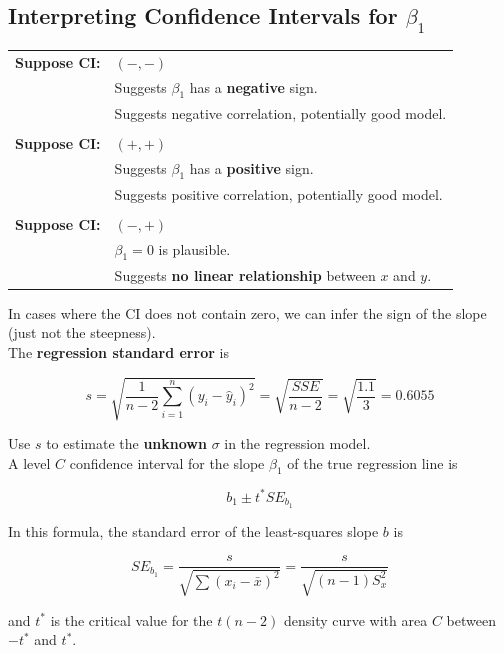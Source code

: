 \subsection*{Interpreting Confidence Intervals for $\beta_1$}

\begin{center}
\begin{tabular}{rl}
\textbf{Suppose CI:} & $(-, -)$ \\
& Suggests $\beta_1$ has a \textbf{negative} sign. \\
& Suggests negative correlation, potentially good model. \\
\\
\textbf{Suppose CI:} & $(+, +)$ \\
& Suggests $\beta_1$ has a \textbf{positive} sign. \\
& Suggests positive correlation, potentially good model. \\
\\
\textbf{Suppose CI:} & $(-, +)$ \\
& $\beta_1 = 0$ is plausible. \\
& Suggests \textbf{no linear relationship} between $x$ and $y$.
\end{tabular}
\end{center}

\vspace{0.5em}
In cases where the CI does not contain zero, we can infer the sign of the slope (just not the steepness).\\

The \textbf{regression standard error} is

\[
s = \sqrt{\frac{1}{n - 2} \sum_{i=1}^n (y_i - \hat{y}_i)^2} = \sqrt{\frac{SSE}{n - 2}} = \sqrt{\frac{1.1}{3}} = 0.6055
\]

Use $s$ to estimate the \textbf{unknown} $\sigma$ in the regression model.\\

A level $C$ confidence interval for the slope $\beta_1$ of the true regression line is

\[
b_1 \pm t^* SE_{b_1}
\]

In this formula, the standard error of the least-squares slope $b$ is

\[
SE_{b_1} = \frac{s}{\sqrt{\sum (x_i - \bar{x})^2}} = \frac{s}{\sqrt{(n - 1) S_x^2}}
\]

and $t^*$ is the critical value for the $t(n - 2)$ density curve with area $C$ between $-t^*$ and $t^*$.

